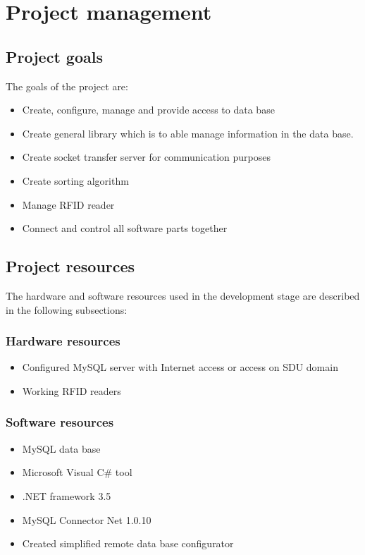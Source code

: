 %
\section{Project management}

\subsection{Project goals}

The goals of the project are:

\begin{itemize}
	\item Create, configure, manage and provide access to data base
	\item Create general library which is to able manage information in the data base.
	\item Create socket transfer server for communication purposes
	\item Create sorting algorithm
	\item Manage RFID reader
	\item Connect and control all software parts together
\end{itemize}

\subsection{Project resources}

The hardware and software resources used in the development stage are described in the following subsections:

\subsubsection{Hardware resources}
\begin{itemize}
	\item Configured MySQL server with Internet access or access on SDU domain
	\item Working RFID readers
\end{itemize}

\subsubsection{Software resources}
\begin{itemize}
	\item MySQL data base
	\item Microsoft Visual C\# tool
	\item .NET framework 3.5
	\item MySQL Connector Net 1.0.10
	\item Created simplified remote data base configurator
\end{itemize}

